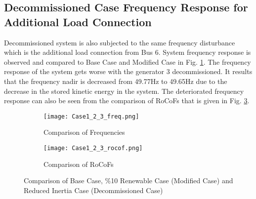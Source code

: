\subsection{Decommissioned Case Frequency Response for Additional Load Connection}
Decommissioned system is also subjected to the same frequency disturbance which is the additional load connection from Bus 6. System frequency response is observed and compared to Base Case and Modified Case in Fig. \ref{Case1_2_3_freq}. The frequency response of the system gets worse with the generator 3 decommissioned. It results that the frequency nadir is decreased from 49.77Hz to 49.65Hz due to the decrease in the stored kinetic energy in the system. The deteriorated frequency response can also be seen from the comparison of RoCoFs that is given in Fig. \ref{Case1_2_3_rocof}. 
\begin{figure}[h!]
	\centering
	\begin{subfigure}{0.8\textwidth} %
	\centering	\texttt{[image: Case1\_2\_3\_freq.png]}
		\caption{Comparison of Frequencies}		
		\label{Case1_2_3_freq}
	\end{subfigure}
	\vspace{0.1em} %
	\begin{subfigure}{0.8\textwidth}
	\centering	\texttt{[image: Case1\_2\_3\_rocof.png]}
		\caption{Comparison of RoCoFs}
		\label{Case1_2_3_rocof}	
	\end{subfigure}
	\caption{Comparison of Base Case, \%10 Renewable Case (Modified Case) and Reduced Inertia Case (Decommissioned Case)}
\end{figure}
